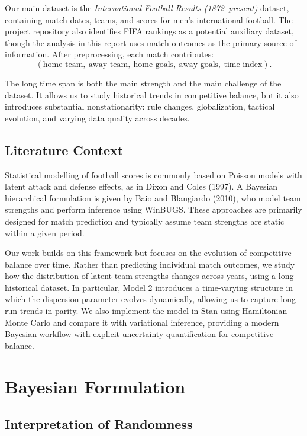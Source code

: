 \documentclass[11pt]{article}
\begin{document}
Our main dataset is the \emph{International Football Results (1872--present)} dataset, containing match dates, teams, and scores for men's international football.
The project repository also identifies FIFA rankings as a potential auxiliary dataset, though the analysis in this report uses match outcomes as the primary source of information.
After preprocessing, each match contributes:
\[
(\text{home team},\ \text{away team},\ \text{home goals},\ \text{away goals},\ \text{time index}).
\]

The long time span is both the main strength and the main challenge of the dataset.
It allows us to study historical trends in competitive balance, but it also introduces substantial nonstationarity: rule changes, globalization, tactical evolution, and varying data quality across decades.

\subsection{Literature Context}

Statistical modelling of football scores is commonly based on Poisson models with latent attack and defense effects, as in Dixon and Coles (1997). A Bayesian hierarchical formulation is given by Baio and Blangiardo (2010), who model team strengths and perform inference using WinBUGS. These approaches are primarily designed for match prediction and typically assume team strengths are static within a given period.

Our work builds on this framework but focuses on the evolution of competitive balance over time. Rather than predicting individual match outcomes, we study how the distribution of latent team strengths changes across years, using a long historical dataset. In particular, Model 2 introduces a time-varying structure in which the dispersion parameter evolves dynamically, allowing us to capture long-run trends in parity. We also implement the model in Stan using Hamiltonian Monte Carlo and compare it with variational inference, providing a modern Bayesian workflow with explicit uncertainty quantification for competitive balance.

\section{Bayesian Formulation}

\subsection{Interpretation of Randomness}
\end{document}
